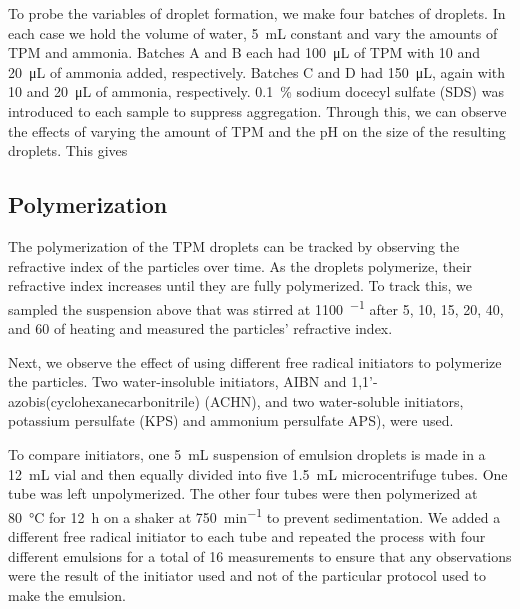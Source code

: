 To probe the variables of droplet formation, we make four batches of droplets.
In each case we hold the volume of water, \SI{5}{\milli \liter} constant 
and vary the amounts of TPM and ammonia. Batches A and B each had 
\SI{100}{\micro\liter} of TPM with \si{10} and \SI{20}{\micro\liter} of 
ammonia added, respectively. Batches C and D had \SI{150}{\micro\liter}, 
again with \si{10} and \SI{20}{\micro\liter} of ammonia, respectively. 
\SI{0.1}{\percent} sodium docecyl sulfate (SDS) was introduced to
each sample to suppress aggregation. Through this, we can observe the effects of
varying the amount of TPM and the pH on the size of the resulting droplets.
This gives 

\subsection{Polymerization}

The polymerization of the TPM droplets can be tracked by observing the 
refractive index of the particles over time. As the droplets polymerize, 
their refractive index increases until they are fully polymerized. To track 
this, we sampled the suspension above that was stirred at \SI{1100}{\min^{-1}}
after \si{5}, \si{10}, \si{15}, \si{20}, \si{40}, and \SI{60}{\min} of 
heating and measured the particles' refractive index. 

Next, we observe the effect of using different free radical initiators 
to polymerize the particles. Two water-insoluble initiators, AIBN and
\num{1},\num{1}'-azobis(cyclohexanecarbonitrile) (ACHN), and two water-soluble 
initiators, potassium persulfate (KPS) and ammonium persulfate APS), were 
used.

To compare initiators, one \SI{5}{\milli \liter} suspension of emulsion droplets is
made in a \SI{12}{\milli \liter} vial and then equally divided into five
\SI{1.5}{\milli \liter} microcentrifuge tubes. One tube was left unpolymerized. The
other four tubes were then polymerized at \SI{80}{\celsius} 
for \SI{12}{\hour} on a shaker at \SI{750}{\minute^{-1}} %
to prevent sedimentation.
We added a different free radical initiator to each tube and repeated the process with four
different emulsions for a total of 
\num{16} measurements to ensure that any observations were the result of the 
initiator used and not of the particular protocol used to make the emulsion.

